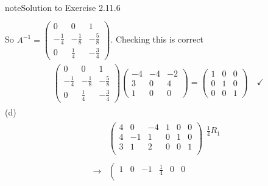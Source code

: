 \documentclass[letterpaper,10pt,english]{jupyterBook}
\begin{document}
\begin{sphinxadmonition}{note}{Solution to Exercise 2.11.6}
\begin{equation*}
\begin{split}
\begin{align*}
\end{align*} \end{split}
\end{equation*}
\sphinxAtStartPar
So \(A^{-1} = \left(\begin{matrix}0 & 0 & 1\\- \frac{1}{4} & - \frac{1}{8} & - \frac{5}{8}\\0 & \frac{1}{4} & - \frac{3}{4}\end{matrix}\right)\). Checking this is correct
\begin{equation*}
\begin{split} \begin{align*} 
    \left(\begin{matrix}0 & 0 & 1\\- \frac{1}{4} & - \frac{1}{8} & - \frac{5}{8}\\0 & \frac{1}{4} & - \frac{3}{4}\end{matrix}\right)\left(\begin{matrix}-4 & -4 & -2\\3 & 0 & 4\\1 & 0 & 0\end{matrix}\right) = \left(\begin{matrix}1 & 0 & 0\\0 & 1 & 0\\0 & 0 & 1\end{matrix}\right) \quad \checkmark\end{align*} \end{split}
\end{equation*}
\sphinxAtStartPar
(d)
\begin{equation*}
\begin{split} \begin{align*} 
    & \left( \begin{array}{ccc|ccc} 
         4 & 0 & -4 & 1 & 0 & 0 \\ 
         4 & -1 & 1 & 0 & 1 & 0 \\ 
         3 & 1 & 2 & 0 & 0 & 1 \\ 
    \end{array} \right) 
    \begin{array}{l} \frac{1}{4} R_{1}\\ \phantom{x} \\ \phantom{x} \end{array} \\ \\ 
    \longrightarrow 
    & \left( \begin{array}{ccc|ccc} 
         1 & 0 & -1 & \frac{1}{4} & 0 & 0 \\ 

\end{array}
\end{align*}
\end{split}
\end{equation*}
\end{sphinxadmonition}
\end{document}
